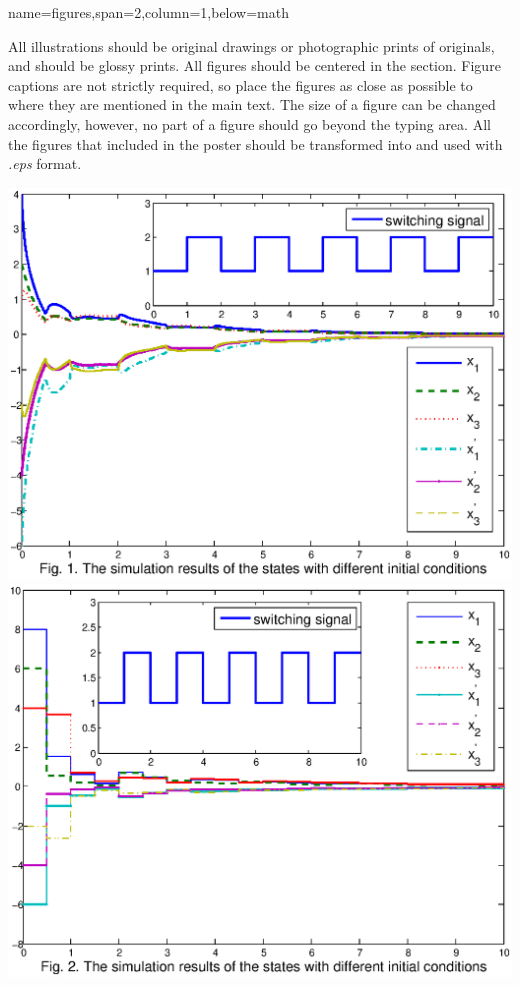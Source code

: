 \documentclass[a0paper,portrait]{baposter}      %
\begin{document}
\begin{poster}
{name=figures,span=2,column=1,below=math}{
\setlength{\parindent}{1.5em} All illustrations should be original drawings or photographic prints of originals, and should be glossy prints.
All figures should be centered in the section. Figure captions are not strictly required, so place the figures
as close as possible to where they are mentioned in the main text. The size of a figure can be changed accordingly,
however, no part of a figure should go beyond the typing area. All the figures that included in the poster should
be transformed into and used with \emph{.eps} format.\vspace{4mm}
\begin{center}
  \includegraphics[width=0.45\linewidth]{Figure1}
  \includegraphics[width=0.45\linewidth]{Figure2}
\end{center}
\vspace{1mm}}



\end{poster}
\end{document}
